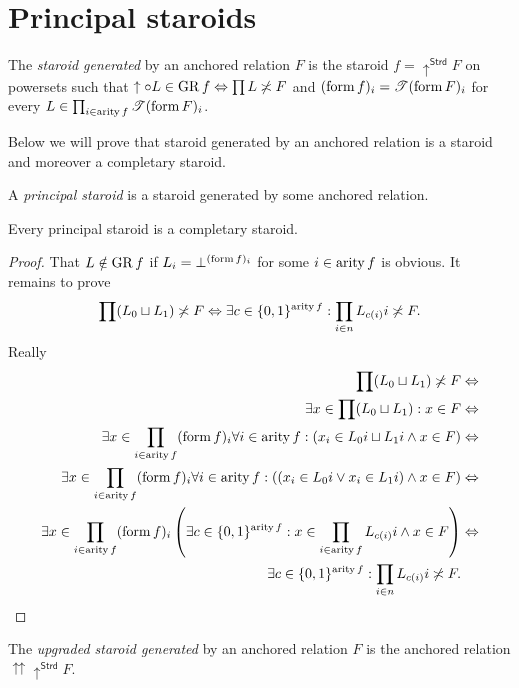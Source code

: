 \section{Principal staroids}
\begin{defn}
The \emph{staroid generated} by an anchored
relation $F$ is the staroid $f=\uparrow^{\mathsf{Strd}}F$ on powersets
such that $\uparrow\circ L\in\operatorname{GR} f\Leftrightarrow\prod L\not\asymp F$
and $(\operatorname{form} f)_{i}=\mathscr{T}(\operatorname{form} F)_{i}$ for every $L\in\prod_{i\in\operatorname{arity} f}\mathscr{T}(\operatorname{form} F)_{i}$.\end{defn}
\begin{rem}
Below we will prove that staroid generated by an anchored relation
is a staroid and moreover a completary staroid.\end{rem}
\begin{defn}
A \emph{principal staroid} is a staroid
generated by some anchored relation.\end{defn}
\begin{prop}
Every principal staroid is a completary staroid.\end{prop}
\begin{proof}
That $L\notin\operatorname{GR} f$ if $L_{i}=\bot^{(\operatorname{form} f)_{i}}$ for some $i\in\operatorname{arity} f$
is obvious. It remains to prove 
\[
\prod(L_{0}\sqcup L_{1})\not\asymp F\Leftrightarrow\exists c\in\{0,1\}^{\operatorname{arity} f}:\prod_{i\in n}L_{c(i)}i\not\asymp F.
\]
Really
\begin{align*}
\prod(L_{0}\sqcup L_{1})\not\asymp F & \Leftrightarrow\\
\exists x\in\prod(L_{0}\sqcup L_{1}):x\in F & \Leftrightarrow\\
\exists x\in\prod_{i\in\operatorname{arity} f}(\operatorname{form} f)_{i}\forall i\in\operatorname{arity} f:(x_{i}\in L_{0}i\sqcup L_{1}i\land x\in F) & \Leftrightarrow\\
\exists x\in\prod_{i\in\operatorname{arity} f}(\operatorname{form} f)_{i}\forall i\in\operatorname{arity} f:((x_{i}\in L_{0}i\lor x_{i}\in L_{1}i)\land x\in F) & \Leftrightarrow\\
\exists x\in\prod_{i\in\operatorname{arity} f}(\operatorname{form} f)_{i}\left(\exists c\in\{0,1\}^{\operatorname{arity} f}:x\in\prod_{i\in\operatorname{arity} f}L_{c(i)}i\land x\in F\right) & \Leftrightarrow\\
\exists c\in\{0,1\}^{\operatorname{arity} f}:\prod_{i\in n}L_{c(i)}i\not\asymp F.
\end{align*}
\end{proof}
\begin{defn}
The \emph{upgraded staroid generated}
by an anchored relation $F$ is the anchored relation $\upuparrows\uparrow^{\mathsf{Strd}}F$.\end{defn}
